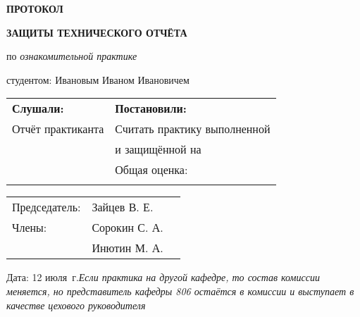 \begin{center}
\bfseries{\large ПРОТОКОЛ }

\vspace{12pt}

\bfseries{ЗАЩИТЫ ТЕХНИЧЕСКОГО ОТЧЁТА}
\end{center}
\noindent
по {\itshape ознакомительной практике}

\vspace{8pt}
\noindent
студентом:
\noindent
Ивановым Иваном Ивановичем

\begin{longtable}{p{7cm}|p{11cm}}
    \hline
    {\bfseries Слушали:} & {\bfseries Постановили:}  \\
    Отчёт практиканта & Считать практику выполненной \\
    & и защищённой на \\
    \rule{0pt}{450pt} & Общая оценка: \underline{\hspace{2in}}\\
    \rule{0pt}{15pt} & \\
    \hline
\end{longtable}

\vfill

\noindent\begin{tabular}{@{}l l l}
Председатель: & Зайцев В. Е. & \underline{\hspace{2in}} \\
Члены: & Сорокин С. А. & \underline{\hspace{2in}} \\
& Инютин М. А. & \underline{\hspace{2in}}
\end{tabular}
\vspace{12pt}

\noindent
Дата: 12 июля \the\year\,г.\hspace{50pt}\textit{Если практика на другой кафедре, то состав комиссии меняется, но представитель кафедры 806 остаётся в комиссии и выступает в качестве цехового руководителя}

\pagebreak
